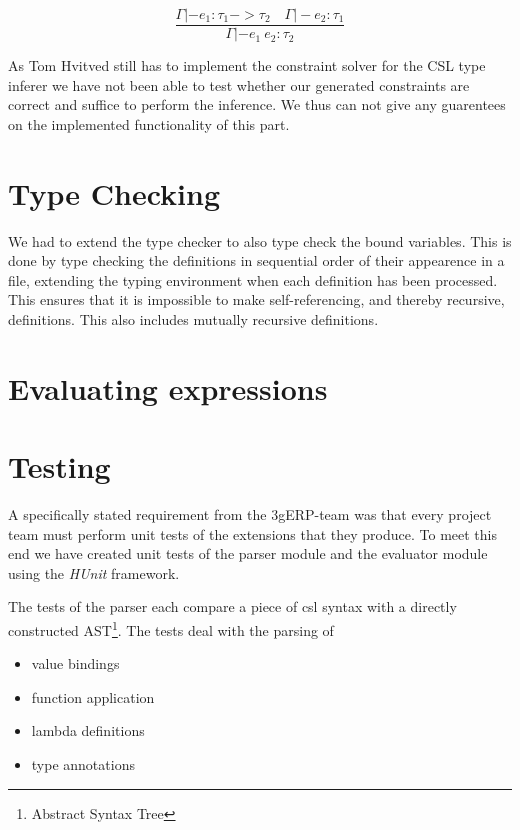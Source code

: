 \documentclass[10pt,a4paper,final,oneside,openany,article]{memoir}
\begin{document}
\begin{equation*}
\frac{
  \Gamma |- e_1 : \tau_1 -> \tau_2
  \quad \Gamma |- e_2 : \tau_1
}{
  \Gamma |- e_1~ e_2 : \tau_2
}\label{eq:type_apply}
\end{equation*}

As Tom Hvitved still has to implement the constraint solver for the
CSL type inferer we have not been able to test whether our generated
constraints are correct and suffice to perform the inference. We thus
can not give any guarentees on the implemented functionality of this part.


\section{Type Checking}
We had to extend the type checker to also type check the bound
variables. This is done by type checking the definitions in sequential
order of their appearence in a file, extending the typing environment
when each definition has been processed. This ensures that it is
impossible to make self-referencing, and thereby recursive, definitions.
This also includes mutually recursive definitions.

\section{Evaluating expressions}


\section{Testing}
A specifically stated requirement from the 3gERP-team was that every
project team must perform unit tests of the extensions that they
produce. To meet this end we have created unit tests of the parser
module and the evaluator module using the \emph{HUnit} framework.

The tests of the parser each compare a piece of csl syntax with a
directly constructed AST\footnote{Abstract Syntax Tree}.  The tests
deal with the parsing of

\begin{itemize}

  \item value bindings

  \item function application

  \item lambda definitions

  \item type annotations

\end{itemize}
\end{document}
